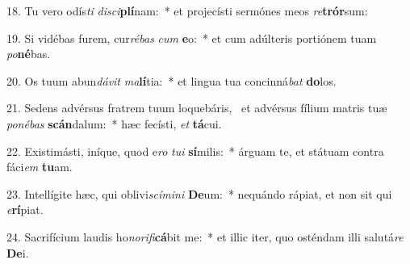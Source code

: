 18. Tu vero odís\textit{ti} \textit{di}\textit{sci}\textbf{plí}nam:~*  et projecísti sermónes meos \textit{re}\textbf{trór}sum:\

19. Si vidébas furem, cur\textit{ré}\textit{bas} \textit{cum} \textbf{e}o:~*  et cum adúlteris portiónem tuam \textit{po}\textbf{né}bas.\

20. Os tuum abun\textit{dá}\textit{vit} \textit{ma}\textbf{lí}tia:~*  et lingua tua concinná\textit{bat} \textbf{do}los.\

21. Sedens advérsus fratrem tuum loquebáris, \dag\  et advérsus fílium matris tuæ \textit{po}\textit{né}\textit{bas} \textbf{scán}dalum:~*  hæc fecísti, \textit{et} \textbf{tá}cui.\

22. Existimásti, iníque, quod e\textit{ro} \textit{tu}\textit{i} \textbf{sí}milis:~*  árguam te, et státuam contra fáci\textit{em} \textbf{tu}am.\

23. Intellígite hæc, qui oblivi\textit{scí}\textit{mi}\textit{ni} \textbf{De}um:~*  nequándo rápiat, et non sit qui \textit{e}\textbf{rí}piat.\

24. Sacrifícium laudis ho\textit{no}\textit{ri}\textit{fi}\textbf{cá}bit me:~*  et illic iter, quo osténdam illi salutá\textit{re} \textbf{De}i.\

